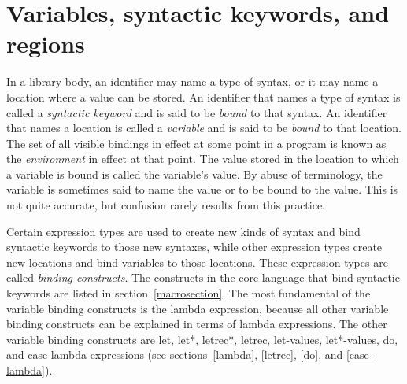 \section{Variables, syntactic keywords, and regions}
\label{specialformsection}
\label{variablesection}

In a library body,
an identifier may name a type of syntax, or it may name
a location where a value can be stored.  An identifier that names a type
of syntax is called a {\em syntactic keyword}
and is said to be {\em bound} to that syntax.  An identifier that names a
location is called a {\em variable} and is said to be
{\em bound} to that location.  The set of all visible
bindings in effect at some point in a program is
known as the {\em environment} in effect at that point.  The value
stored in the location to which a variable is bound is called the
variable's value.  By abuse of terminology, the variable is sometimes
said to name the value or to be bound to the value.  This is not quite
accurate, but confusion rarely results from this practice.



\vest Certain expression types are used to create new kinds of syntax
and bind syntactic keywords to those new syntaxes, while other
expression types create new locations and bind variables to those
locations.  These expression types are called {\em binding constructs}.
The constructs in the core language that bind syntactic keywords are listed in section~\ref{macrosection}.
The most fundamental of the variable binding constructs is the
{\cf lambda} expression, because all other variable binding constructs
can be explained in terms of {\cf lambda} expressions.  The other
variable binding constructs are {\cf let}, {\cf let*}, {\cf letrec*},
{\cf letrec}, {\cf let-values}, {\cf let*-values}, {\cf do}, and {\cf
  case-lambda} expressions (see sections~\ref{lambda}, \ref{letrec}, 
\ref{do}, and \ref{case-lambda}).


